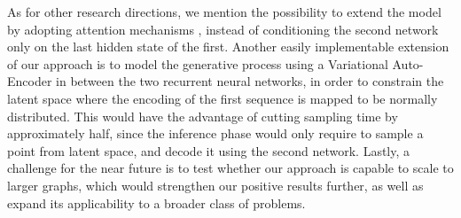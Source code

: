 As for other research directions, we mention the possibility to extend the model by adopting attention mechanisms \citep{bahdanau2015attention}, instead of conditioning the second network only on the last hidden state of the first. Another easily implementable extension of our approach is to model the generative process using a Variational Auto-Encoder in between the two recurrent neural networks, in order to constrain the latent space where the encoding of the first sequence is mapped to be normally distributed. This would have the advantage of cutting sampling time by approximately half, since the inference phase would only require to sample a point from latent space, and decode it using the second network. Lastly, a challenge for the near future is to test whether our approach is capable to scale to larger graphs, which would strengthen our positive results further, as well as expand its applicability to a broader class of problems.
